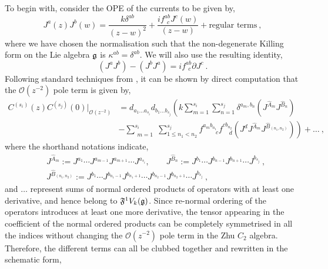 To begin with, consider the OPE of the currents to be given by,
\begin{equation}
    J^a(z) J^b(w) = \frac{k \delta^{a b}}{(z-w)^2} + \frac{i f^{ab}_{\ \ c} J^c(w)}{(z-w)} + \text{regular terms}~,
\end{equation}
where we have chosen the normalisation such that the non-degenerate Killing form on the Lie algebra $\mathfrak{g}$ is $\kappa^{ab} = \delta^{ab}$. We will also use the resulting identity,
\begin{equation} \label{eq:AntiSymJJ}
    (J^a J^b) - (J^bJ^a) = if^{ab}_{\ \ c} \partial J^c~. 
\end{equation}
Following standard techniques from \cite{Bais:1987dc, SEVRIN1988465, Kac:1996wd}, it can be shown by direct computation that the $\mathcal{O}(z^{-2})$ pole term is given by,
\begin{equation} \label{eq:order2pole}
\begin{split}
    C^{(s_i)}(z) C^{(s_j)}(0)|_{\mathcal{O}(z^{-2})} &= d_{a_1 \ldots a_{s_i}} d_{b_1 \ldots b_{s_j}}\left(k \sum_{m=1}^{s_i} \sum_{n=1}^{s_j} \delta^{a_m,b_n} \left(J^{\hat{A}_m} J^{\hat{B}_n}\right) \right. \\ 
    &\left. - \sum_{\substack{m=1}}^{s_i} \sum_{1 \leqslant n_1 < n_2}^{s_j} f^{a_{m} b_{n_1}}_{\qquad \ c} f^{c b_{n_2}}_{\ \ \ \ \ d} \left(J^d J^{\hat{A}_{m}} J^{\hat{B}_{(n_1,n_2)}}\right) \right) + \ldots~, 
\end{split}
\end{equation}
where the shorthand notations indicate,
\begin{equation}
\begin{split}
    &J^{\hat{A}_{m}} := J^{a_1} \cdots J^{a_{m-1}} J^{a_{m+1}} \cdots J^{a_{s_i}}, \qquad J^{\hat{B}_{n}} := J^{b_1} \cdots J^{b_{n-1}} J^{b_{n+1}} \cdots J^{b_{s_j}}~, \\
    &J^{\hat{B}_{(n_1,n_2)}} := J^{b_1} \cdots J^{b_{n_1-1}} J^{b_{n_1+1}} \cdots J^{b_{n_2-1}} J^{b_{n_2+1}} \cdots J^{b_{s_j}}~,
\end{split}
\end{equation}
and $\ldots$ represent sums of normal ordered products of operators with at least one derivative, and hence belong to $\mathfrak{F}^1 V_k(\mathfrak{g})$. Since re-normal ordering of the operators introduces at least one more derivative, the tensor appearing in the coefficient of the normal ordered products can be completely symmetrised in all the indices without changing the $\mathcal{O}(z^{-2})$ pole term in the Zhu $C_2$ algebra. Therefore, the different terms can all be clubbed together and rewritten in the schematic form,
